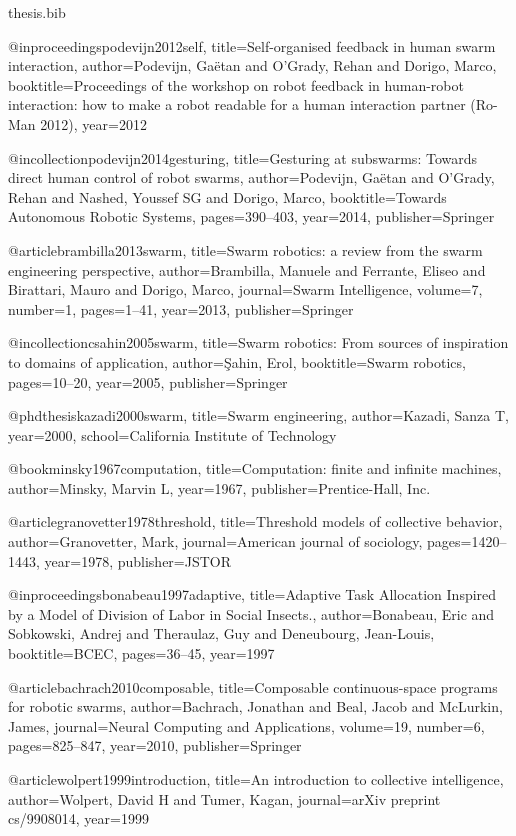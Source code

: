 \documentclass[a4paper, 12pt]{report}
\begin{document}
\begin{filecontents}{thesis.bib}

@inproceedings{podevijn2012self,
  title={Self-organised feedback in human swarm interaction},
  author={Podevijn, Ga{\"e}tan and O’Grady, Rehan and Dorigo, Marco},
  booktitle={Proceedings of the workshop on robot feedback in human-robot interaction: how to make a robot readable for a human interaction partner (Ro-Man 2012)},
  year={2012}
}

@incollection{podevijn2014gesturing,
  title={Gesturing at subswarms: Towards direct human control of robot swarms},
  author={Podevijn, Ga{\"e}tan and O’Grady, Rehan and Nashed, Youssef SG and Dorigo, Marco},
  booktitle={Towards Autonomous Robotic Systems},
  pages={390--403},
  year={2014},
  publisher={Springer}
}

@article{brambilla2013swarm,
  title={Swarm robotics: a review from the swarm engineering perspective},
  author={Brambilla, Manuele and Ferrante, Eliseo and Birattari, Mauro and Dorigo, Marco},
  journal={Swarm Intelligence},
  volume={7},
  number={1},
  pages={1--41},
  year={2013},
  publisher={Springer}
}

@incollection{csahin2005swarm,
  title={Swarm robotics: From sources of inspiration to domains of application},
  author={{\c{S}}ahin, Erol},
  booktitle={Swarm robotics},
  pages={10--20},
  year={2005},
  publisher={Springer}
}

@phdthesis{kazadi2000swarm,
  title={Swarm engineering},
  author={Kazadi, Sanza T},
  year={2000},
  school={California Institute of Technology}
}

@book{minsky1967computation,
  title={Computation: finite and infinite machines},
  author={Minsky, Marvin L},
  year={1967},
  publisher={Prentice-Hall, Inc.}
}

@article{granovetter1978threshold,
  title={Threshold models of collective behavior},
  author={Granovetter, Mark},
  journal={American journal of sociology},
  pages={1420--1443},
  year={1978},
  publisher={JSTOR}
}

@inproceedings{bonabeau1997adaptive,
  title={Adaptive Task Allocation Inspired by a Model of Division of Labor in Social Insects.},
  author={Bonabeau, Eric and Sobkowski, Andrej and Theraulaz, Guy and Deneubourg, Jean-Louis},
  booktitle={BCEC},
  pages={36--45},
  year={1997}
}

@article{bachrach2010composable,
  title={Composable continuous-space programs for robotic swarms},
  author={Bachrach, Jonathan and Beal, Jacob and McLurkin, James},
  journal={Neural Computing and Applications},
  volume={19},
  number={6},
  pages={825--847},
  year={2010},
  publisher={Springer}
}

@article{wolpert1999introduction,
  title={An introduction to collective intelligence},
  author={Wolpert, David H and Tumer, Kagan},
  journal={arXiv preprint cs/9908014},
  year={1999}
}

\end{filecontents}

\nocite{*}


\end{document}
